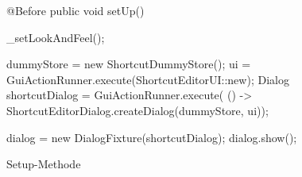 \begin{wrapfigure}[9]{r}[0px]{322px}
    \centering
	\vspace{-12px}
	\begin{spacing}{0.75}
		\begin{javacode}[firstnumber=27]
@Before
public void setUp()
{
  _setLookAndFeel();
  
  dummyStore = new ShortcutDummyStore();
  ui = GuiActionRunner.execute(ShortcutEditorUI::new);
  Dialog shortcutDialog = GuiActionRunner.execute(
      () -> ShortcutEditorDialog.createDialog(dummyStore, ui));
  
  dialog = new DialogFixture(shortcutDialog);
  dialog.show();
}\end{javacode}
	\end{spacing}
	\caption{Setup-Methode}
	\label{fig:Test-ShortcutEditor-onSetUp}
\end{wrapfigure}
